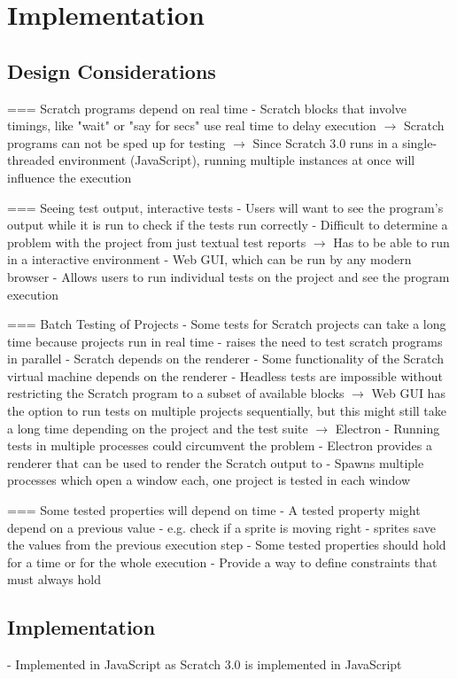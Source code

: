 \chapter{Implementation}

\section{Design Considerations}
=== Scratch programs depend on real time
- Scratch blocks that involve timings, like "wait" or "say for secs" use real time to delay execution
$\rightarrow$ Scratch programs can not be sped up for testing
$\rightarrow$ Since Scratch 3.0 runs in a single-threaded environment (JavaScript), running multiple instances
              at once will influence the execution

=== Seeing test output, interactive tests
- Users will want to see the program's output while it is run to check if the tests run correctly
    - Difficult to determine a problem with the project from just textual test reports
$\rightarrow$ Has to be able to run in a interactive environment
    - Web GUI, which can be run by any modern browser
    - Allows users to run individual tests on the project and see the program execution

=== Batch Testing of Projects
- Some tests for Scratch projects can take a long time because projects run in real time
    - raises the need to test scratch programs in parallel
    - Scratch depends on the renderer
        - Some functionality of the Scratch virtual machine depends on the renderer
        - Headless tests are impossible without restricting the Scratch program to a subset of available blocks
$\rightarrow$ Web GUI has the option to run tests on multiple projects sequentially, but this might still take a long time depending on the project and the test suite
$\rightarrow$ Electron
    - Running tests in multiple processes could circumvent the problem
    - Electron provides a renderer that can be used to render the Scratch output to
    - Spawns multiple processes which open a window each, one project is tested in each window

=== Some tested properties will depend on time
- A tested property might depend on a previous value
    - e.g. check if a sprite is moving right
    - sprites save the values from the previous execution step
- Some tested properties should hold for a time or for the whole execution
    - Provide a way to define constraints that must always hold

\section{Implementation}
- Implemented in JavaScript as Scratch 3.0 is implemented in JavaScript

